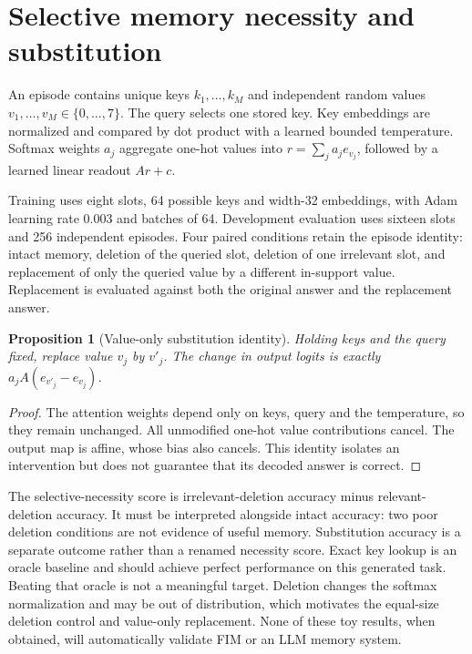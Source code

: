 \documentclass[10pt]{article}
\newtheorem{proposition}{Proposition}
\begin{document}
\section{Selective memory necessity and substitution}
An episode contains unique keys $k_1,\ldots,k_M$ and independent random values $v_1,\ldots,v_M\in\{0,\ldots,7\}$. The query selects one stored key. Key embeddings are normalized and compared by dot product with a learned bounded temperature. Softmax weights $a_j$ aggregate one-hot values into $r=\sum_j a_j e_{v_j}$, followed by a learned linear readout $Ar+c$.

Training uses eight slots, 64 possible keys and width-32 embeddings, with Adam learning rate $0.003$ and batches of 64. Development evaluation uses sixteen slots and 256 independent episodes. Four paired conditions retain the episode identity: intact memory, deletion of the queried slot, deletion of one irrelevant slot, and replacement of only the queried value by a different in-support value. Replacement is evaluated against both the original answer and the replacement answer.

\begin{proposition}[Value-only substitution identity]
Holding keys and the query fixed, replace value $v_j$ by $v'_j$. The change in output logits is exactly $a_jA(e_{v'_j}-e_{v_j})$.
\end{proposition}
\begin{proof}
The attention weights depend only on keys, query and the temperature, so they remain unchanged. All unmodified one-hot value contributions cancel. The output map is affine, whose bias also cancels. This identity isolates an intervention but does not guarantee that its decoded answer is correct.
\end{proof}

The selective-necessity score is irrelevant-deletion accuracy minus relevant-deletion accuracy. It must be interpreted alongside intact accuracy: two poor deletion conditions are not evidence of useful memory. Substitution accuracy is a separate outcome rather than a renamed necessity score. Exact key lookup is an oracle baseline and should achieve perfect performance on this generated task. Beating that oracle is not a meaningful target. Deletion changes the softmax normalization and may be out of distribution, which motivates the equal-size deletion control and value-only replacement. None of these toy results, when obtained, will automatically validate FIM or an LLM memory system.
\end{document}
